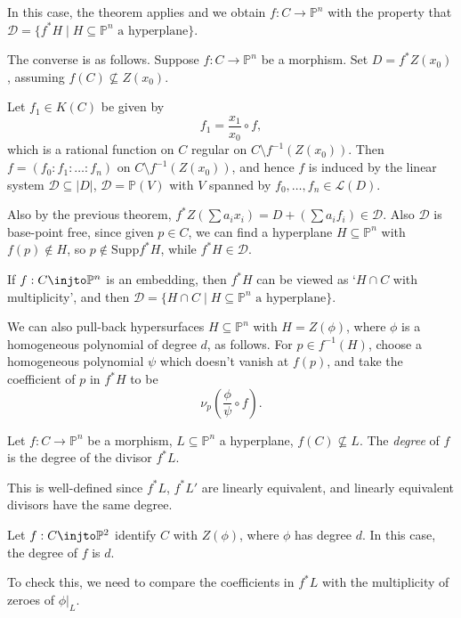 \documentclass[12pt]{article}
\begin{document}
In this case, the theorem applies and we obtain $f : C \to \mathbb{P}^n$ with the property that $\mathcal{D} = \{f^\ast H \mid H \subseteq \mathbb{P}^n \text{ a hyperplane}\}$.

The converse is as follows. Suppose $f : C \to \mathbb{P}^n$ be a morphism. Set $D = f^\ast Z(x_0)$, assuming $f(C) \not \subseteq Z(x_0)$.

Let $f_1 \in K(C)$ be given by
\[
f_1 = \frac{x_1}{x_0} \circ f,
\]
which is a rational function on $C$ regular on $C \setminus f^{-1}(Z(x_0))$. Then $f = (f_0 : f_1 : \ldots : f_n)$ on $C \setminus f^{-1}(Z(x_0))$, and hence $f$ is induced by the linear system $\mathcal{D} \subseteq |D|$, $\mathcal{D} = \mathbb{P}(V)$ with $V$ spanned by $f_0, \ldots, f_n \in \mathcal{L}(D)$.

Also by the previous theorem, $f^\ast Z(\sum a_i x_i) = D + (\sum a_i f_i) \in \mathcal{D}$. Also $\mathcal{D}$ is base-point free, since given $p \in C$, we can find a hyperplane $H \subseteq \mathbb{P}^n$ with $f(p) \not \in H$, so $p \not \in \mathrm{Supp} f^\ast H$, while $f^\ast H \in \mathcal{D}$.

\begin{remark}
	If $f : C \injto \mathbb{P}^n$ is an embedding, then $f^\ast H$ can be viewed as `$H \cap C$ with multiplicity', and then $\mathcal{D} = \{ H \cap C \mid H \subseteq \mathbb{P}^n \text{ a hyperplane}\}$.

	We can also pull-back hypersurfaces $H \subseteq \mathbb{P}^n$ with $H = Z(\phi)$, where $\phi$ is a homogeneous polynomial of degree $d$, as follows. For $p \in f^{-1}(H)$, choose a homogeneous polynomial $\psi$ which doesn't vanish at $f(p)$, and take the coefficient of $p$ in $f^\ast H$ to be
	\[
	\nu_p \left( \frac{\phi}{\psi} \circ f \right).
	\]
\end{remark}

\begin{definition}
	Let $f : C \to \mathbb{P}^n$ be a morphism, $L \subseteq \mathbb{P}^n$ a hyperplane, $f(C) \not \subseteq L$. The \emph{degree} of $f$ is the degree of the divisor $f^\ast L$.
\end{definition}

This is well-defined since $f^\ast L$, $f^\ast L'$ are linearly equivalent, and linearly equivalent divisors have the same degree.

\begin{exbox}
	Let $f : C \injto \mathbb{P}^2$ identify $C$ with $Z(\phi)$, where $\phi$ has degree $d$. In this case, the degree of $f$ is $d$.

	To check this, we need to compare the coefficients in $f^\ast L$ with the multiplicity of zeroes of $\phi|_L$.
\end{exbox}
\end{document}
